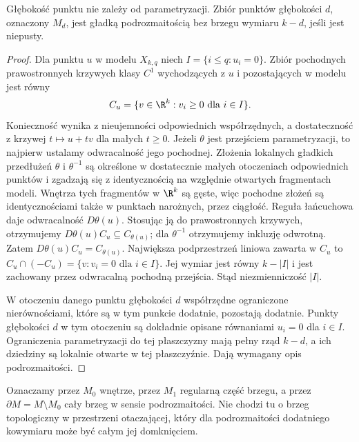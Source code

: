 \begin{stwierdzenie}
\label{ma2:prop:corner-depth}
Głębokość punktu nie zależy od parametryzacji.
Zbiór punktów głębokości $d$, oznaczony $M_d$,
jest gładką podrozmaitością bez brzegu
wymiaru $k-d$, jeśli jest niepusty.
\end{stwierdzenie}
\begin{proof}
Dla punktu $u$ w modelu $X_{k,q}$ niech
$I=\{i\le q:u_i=0\}$. Zbiór pochodnych
prawostronnych krzywych klasy $C^1$ wychodzących
z $u$ i pozostających w modelu jest równy
\[
 C_u=\{v\in\R^k:v_i\ge0\text{ dla }i\in I\}.
\]
Konieczność wynika z nieujemności odpowiednich
współrzędnych, a dostateczność z krzywej
$t\mapsto u+tv$ dla małych $t\ge0$.
Jeżeli $\theta$ jest przejściem parametryzacji,
to najpierw ustalamy odwracalność jego pochodnej.
Złożenia lokalnych gładkich przedłużeń
$\theta$ i $\theta^{-1}$ są określone
w dostatecznie małych otoczeniach odpowiednich
punktów i zgadzają się z identycznością na
względnie otwartych fragmentach modeli.
Wnętrza tych fragmentów w $\R^k$ są gęste,
więc pochodne złożeń są identycznościami
także w punktach narożnych, przez ciągłość.
Reguła łańcuchowa daje odwracalność $D\theta(u)$.
Stosując ją do prawostronnych krzywych,
otrzymujemy $D\theta(u)C_u\subseteq C_{\theta(u)}$;
dla $\theta^{-1}$ otrzymujemy inkluzję odwrotną.
Zatem $D\theta(u)C_u=C_{\theta(u)}$.
Największa podprzestrzeń liniowa zawarta w $C_u$
to $C_u\cap(-C_u)=\{v:v_i=0\text{ dla }i\in I\}$.
Jej wymiar jest równy $k-|I|$ i jest zachowany
przez odwracalną pochodną przejścia.
Stąd niezmienniczość $|I|$.

W otoczeniu danego punktu głębokości $d$
współrzędne ograniczone nierównościami,
które są w tym punkcie dodatnie, pozostają
dodatnie. Punkty głębokości $d$ w tym
otoczeniu są dokładnie opisane równaniami
$u_i=0$ dla $i\in I$. Ograniczenia
parametryzacji do tej płaszczyzny mają pełny
rząd $k-d$, a ich dziedziny są lokalnie otwarte
w tej płaszczyźnie. Dają wymagany opis
podrozmaitości.
\end{proof}

Oznaczamy przez $M_0$ wnętrze, przez $M_1$ regularną
część brzegu, a przez $\partial M=M\setminus M_0$
cały brzeg w sensie podrozmaitości.
Nie chodzi tu o brzeg topologiczny w przestrzeni
otaczającej, który dla podrozmaitości dodatniego
kowymiaru może być całym jej domknięciem.

